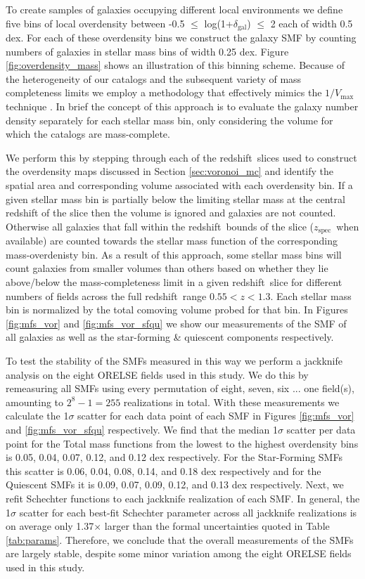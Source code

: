\documentclass[a4paper,fleqn,usenatbib]{mnras}
\def\z{redshift}
\def\zspec{$z_{\mathrm{spec}}$}
\begin{document}
To create samples of galaxies occupying different local environments we define five bins of local overdensity between -0.5 $\leq$ log(1+$\delta_{\mathrm{gal}}$) $\leq$ 2 each of width 0.5 dex.
For each of these overdensity bins we construct the galaxy SMF by counting numbers of galaxies in stellar mass bins of width 0.25 dex.
Figure \ref{fig:overdensity_mass} shows an illustration of this binning scheme.
Because of the heterogeneity of our catalogs and the subsequent variety of mass completeness limits we employ a methodology that effectively mimics the $1 / V_{\mathrm{max}}$ technique \citep{Avni1980}.
In brief the concept of this approach is to evaluate the galaxy number density separately for each stellar mass bin, only considering the volume for which the catalogs are mass-complete.


We perform this by stepping through each of the \z\ slices used to construct the overdensity maps discussed in Section \ref{sec:voronoi_mc} and identify the spatial area and corresponding volume associated with each overdensity bin.
If a given stellar mass bin is partially below the limiting stellar mass at the central redshift of the slice then the volume is ignored and galaxies are not counted.
Otherwise all galaxies that fall within the \z\ bounds of the slice (\zspec\ when available) are counted towards the stellar mass function of the corresponding mass-overdenisty bin.
As a result of this approach, some stellar mass bins will count galaxies from smaller volumes than others based on whether they lie above/below the mass-completeness limit in a given \z\ slice for different numbers of fields across the full \z\ range $0.55 < z < 1.3$.
Each stellar mass bin is normalized by the total comoving volume probed for that bin.
In Figures \ref{fig:mfs_vor} and \ref{fig:mfs_vor_sfqu} we show our measurements of the SMF of all galaxies as well as the star-forming \& quiescent components respectively.


To test the stability of the SMFs measured in this way we perform a jackknife analysis on the eight ORELSE fields used in this study.
We do this by remeasuring all SMFs using every permutation of eight, seven, six ... one field(s), amounting to $2^8 - 1 = 255$ realizations in total.
With these measurements we calculate the 1$\sigma$ scatter for each data point of each SMF in Figures \ref{fig:mfs_vor} and \ref{fig:mfs_vor_sfqu} respectively.
We find that the median 1$\sigma$ scatter per data point for the Total mass functions from the lowest to the highest overdensity bins is 0.05, 0.04, 0.07, 0.12, and 0.12 dex respectively.
For the Star-Forming SMFs this scatter is 0.06, 0.04, 0.08, 0.14, and 0.18 dex respectively and for the Quiescent SMFs it is 0.09, 0.07, 0.09, 0.12, and 0.13 dex respectively.
Next, we refit Schechter functions to each jackknife realization of each SMF.
In general, the 1$\sigma$ scatter for each best-fit Schechter parameter across all jackknife realizations is on average only 1.37$\times$ larger than the formal uncertainties quoted in Table \ref{tab:params}.
Therefore, we conclude that the overall measurements of the SMFs are largely stable, despite some minor variation among the eight ORELSE fields used in this study.
\end{document}

